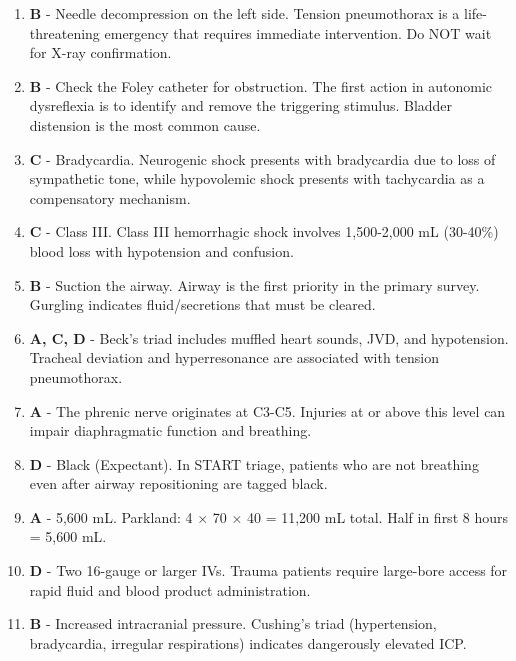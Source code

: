 \documentclass[11pt]{article}
\begin{document}
\begin{enumerate}
    \item \textbf{B} - Needle decompression on the left side. Tension pneumothorax is a life-threatening emergency that requires immediate intervention. Do NOT wait for X-ray confirmation.
    
    \item \textbf{B} - Check the Foley catheter for obstruction. The first action in autonomic dysreflexia is to identify and remove the triggering stimulus. Bladder distension is the most common cause.
    
    \item \textbf{C} - Bradycardia. Neurogenic shock presents with bradycardia due to loss of sympathetic tone, while hypovolemic shock presents with tachycardia as a compensatory mechanism.
    
    \item \textbf{C} - Class III. Class III hemorrhagic shock involves 1,500-2,000 mL (30-40\%) blood loss with hypotension and confusion.
    
    \item \textbf{B} - Suction the airway. Airway is the first priority in the primary survey. Gurgling indicates fluid/secretions that must be cleared.
    
    \item \textbf{A, C, D} - Beck's triad includes muffled heart sounds, JVD, and hypotension. Tracheal deviation and hyperresonance are associated with tension pneumothorax.
    
    \item \textbf{A} - The phrenic nerve originates at C3-C5. Injuries at or above this level can impair diaphragmatic function and breathing.
    
    \item \textbf{D} - Black (Expectant). In START triage, patients who are not breathing even after airway repositioning are tagged black.
    
    \item \textbf{A} - 5,600 mL. Parkland: 4 $\times$ 70 $\times$ 40 = 11,200 mL total. Half in first 8 hours = 5,600 mL.
    
    \item \textbf{D} - Two 16-gauge or larger IVs. Trauma patients require large-bore access for rapid fluid and blood product administration.
    
    \item \textbf{B} - Increased intracranial pressure. Cushing's triad (hypertension, bradycardia, irregular respirations) indicates dangerously elevated ICP.
    

\end{enumerate}
\end{document}
